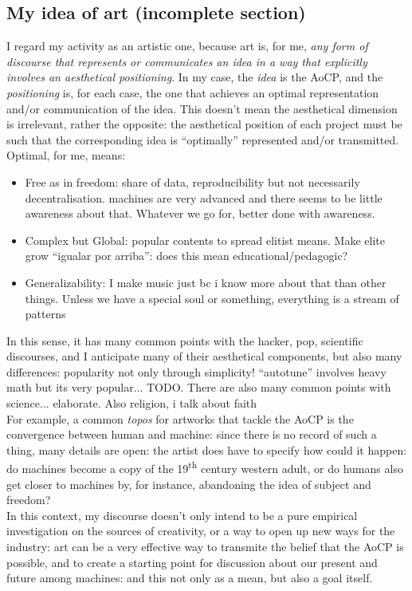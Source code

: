 \documentclass[11pt]{scrartcl} %
\begin{document}
\subsection*{My idea of art (incomplete section)}
I regard my activity as an artistic one, because art is, for me, {\it any form of discourse that represents or communicates an idea in a way that explicitly involves an aesthetical positioning}. In my case, the {\it idea} is the AoCP, and the {\it positioning} is, for each case, the one that achieves an optimal representation and/or communication of the idea. This doesn't mean the aesthetical dimension is irrelevant, rather the opposite: the aesthetical position of each project must be such that the corresponding idea is ``optimally'' represented and/or transmitted. Optimal, for me, means:
\begin{itemize}
\item Free as in freedom: share of data, reproducibility but not necessarily decentralisation. machines are very advanced and there seems to be little awareness about that. Whatever we go for, better done with awareness.
\item Complex but Global: popular contents to spread elitist means. Make elite grow ``igualar por arriba'': does this mean educational/pedagogic?
\item Generalizability: I make music just bc i know more about that than other things. Unless we have a special soul or something, everything is a stream of patterns
\end{itemize}
In this sense, it has many common points with the hacker, pop, scientific discourses, and I anticipate many of their aesthetical components, but also many differences: popularity not only through simplicity! ``autotune'' involves heavy math but its very popular... TODO.
There are also many common points with science... elaborate. Also religion, i talk about faith \\
For example, a common {\it topos} for artworks that tackle the AoCP is the convergence between human and machine: since there is no record of such a thing, many details are open: the artist does have to specify how could it happen: do machines become a copy of the 19\textsuperscript{th} century western adult, or do humans also get closer to machines by, for instance, abandoning the idea of subject and freedom?\\[7pt]
In this context, my discourse doesn't only intend to be a pure empirical investigation on the sources of creativity, or a way to open up new ways for the industry: art can be a very effective way to transmite the belief that the AoCP is possible, and to create a starting point for discussion about our present and future among machines: and this not only as a mean, but also a goal itself.\\
\end{document}
